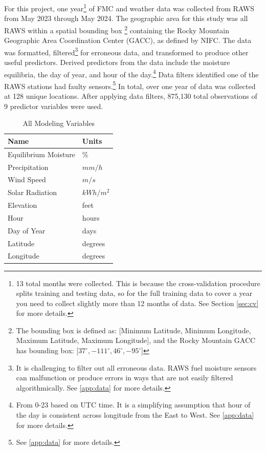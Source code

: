\documentclass[11pt]{article}%
\begin{document}
For this project, one year\footnote{13 total months were collected. This is because the cross-validation procedure splits training and testing data, so for the full training data to cover a year you need to collect slightly more than 12 months of data. See Section \ref{sec:cv} for more details.} of FMC and weather data was collected from RAWS from May 2023 through May 2024. The geographic area for this study was all RAWS within a spatial bounding box
\footnote{
The bounding box is defined as: [Minimum Latitude, Minimum Longitude, Maximum Latitude, Maximum Longitude], and the Rocky Mountain GACC has bounding box: [$37^\circ, -111^\circ, 46^\circ, -95^\circ$]} 
containing the Rocky Mountain Geographic Area Coordination Center (GACC), as defined by NIFC.\cite{NIFC-2024-GAC} The data was formatted,  filtered\footnote{It is challenging to filter out all erroneous data. RAWS fuel moisture sensors can malfunction or produce errors in ways that are not easily filtered algorithmically. See \ref{app:data} for more details.} for erroneous data, and transformed to produce other useful predictors. Derived predictors from the data include the moisture equilibria, the day of year, and hour of the day.\footnote{From 0-23 based on UTC time. It is a simplifying assumption that hour of the day is consistent across longitude from the East to West. See \ref{app:data} for more details.} Data filters identified one of the RAWS stations had faulty sensors.\footnote{See \ref{app:data} for more details.} In total, over one year of data was collected at 128 unique locations. After applying data filters, 875,130 total observations of 9 predictor variables were used.

\begin{table}[ht]
\centering
\caption{All Modeling Variables}
\label{tab:all_vars}
\begin{tabular}{|l|l|}
\hline
\textbf{Name}           & \textbf{Units} \\  \hline
Equilibrium Moisture    & \%             \\ \hline
Precipitation           & $mm/h$           \\ \hline
Wind Speed              & $m/s$            \\ \hline
Solar Radiation         & $kWh/m^2$         \\ \hline
Elevation         & feet         \\ 
\hline
Hour                    & hours              \\ 
\hline
Day of Year             & days              \\ 
\hline
Latitude                & degrees              \\ 
\hline
Longitude               & degrees              \\ 
\hline

\end{tabular}
\end{table}
\end{document}
